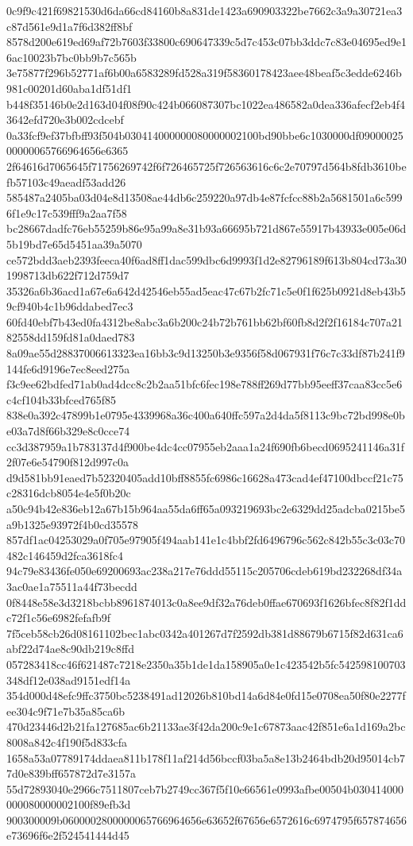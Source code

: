 {0c9f9c421f69821530d6da66cd84160b8a831de1423a690903322be7662c3a9a30721ea3c87d561e9d1a7f6d382ff8bf
8578d200e619ed69af72b7603f33800c690647339c5d7c453c07bb3ddc7c83e04695ed9e16ac10023b7bc0bb9b7c565b
3e75877f296b52771af6b00a6583289fd528a319f58360178423aee48beaf5c3edde6246b981c00201d60aba1df51df1
b448f35146b0e2d163d04f08f90c424b066087307bc1022ea486582a0dea336afecf2eb4f43642efd720e3b002cdcebf
0a33fcf9ef37bfbff93f504b030414000000080000002100bd90bbe6c1030000df0900002500000065766964656e6365
2f64616d7065645f71756269742f6f726465725f726563616c6c2e70797d564b8fdb3610befb57103c49aeadf53add26
585487a2405ba03d04e8d13508ae44db6c259220a97db4e87fcfcc88b2a5681501a6c5996f1e9c17c539fff9a2aa7f58
bc28667dadfc76eb55259b86e95a99a8e31b93a66695b721d867e55917b43933e005e06d5b19bd7e65d5451aa39a5070
ce572bdd3aeb2393feeca40f6ad8ff1dac599dbc6d9993f1d2e82796189f613b804cd73a301998713db622f712d759d7
35326a6b36acd1a67e6a642d42546eb55ad5eac47c67b2fc71c5e0f1f625b0921d8eb43b59cf940b4c1b96ddabed7ec3
60fd40ebf7b43ed0fa4312be8abc3a6b200c24b72b761bb62bf60fb8d2f2f16184c707a2182558dd159fd81a0daed783
8a09ae55d28837006613323ea16bb3c9d13250b3e9356f58d067931f76c7c33df87b241f9144fe6d9196e7ec8eed275a
f3c9ee62bdfed71ab0ad4dcc8c2b2aa51bfc6fec198e788ff269d77bb95eeff37caa83cc5e6c4cf104b33bfced765f85
838e0a392c47899b1e0795e4339968a36c400a640ffc597a2d4da5f8113c9bc72bd998e0be03a7d8f66b329e8c0cce74
cc3d387959a1b783137d4f900be4dc4cc07955eb2aaa1a24f690fb6becd0695241146a31f2f07e6e54790f812d997c0a
d9d581bb91eaed7b52320405add10bff8855fc6986c16628a473cad4ef47100dbccf21c75c28316dcb8054e4e5f0b20c
a50c94b42e836eb12a67b15b964aa55da6ff65a093219693bc2e6329dd25adcba0215be5a9b1325e93972f4b0cd35578
857df1ac04253029a0f705e97905f494aab141e1c4bbf2fd6496796c562c842b55c3c03c70482c146459d2fca3618fc4
94c79e83436fe050e69200693ac238a217e76ddd55115c205706cdeb619bd232268df34a3ac0ae1a75511a44f73becdd
0f8448e58e3d3218bcbb8961874013c0a8ee9df32a76deb0ffae670693f1626bfec8f82f1ddc72f1c56e6982fefafb9f
7f5ceb58cb26d08161102bec1abc0342a401267d7f2592db381d88679b6715f82d631ca6abf22d74ae8c90db219c8ffd
057283418cc46f621487c7218e2350a35b1de1da158905a0e1c423542b5fc542598100703348df12e038ad9151edf14a
354d000d48efc9ffc3750bc5238491ad12026b810bd14a6d84e0fd15e0708ea50f80e2277fee304c9f71e7b35a85ca6b
470d23446d2b21fa127685ac6b21133ae3f42da200c9e1c67873aac42f851e6a1d169a2bc8008a842c4f190f5d833cfa
1658a53a07789174ddaea811b178f11af214d56bccf03ba5a8e13b2464bdb20d95014cb77d0e839bff657872d7e3157a
55d72893040e2966c7511807ceb7b2749cc367f5f10e66561e0993afbe00504b030414000000080000002100f89efb3d
900300009b0600002800000065766964656e63652f67656e6572616c6974795f657874656e73696f6e2f524541444d45
}
